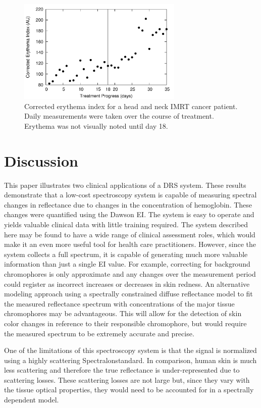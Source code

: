 \begin{figure}
	\centering \includegraphics[width=0.7\textwidth]{figures/p1-cor_ei.png}
	\caption[Corrected erythema index for IMRT cancer patient]{\label{fig:p1-cor_ei}Corrected erythema index for a head and neck IMRT cancer patient. Daily measurements were taken over the course of treatment. Erythema was not visually noted until day 18.}
\end{figure}

\section{Discussion}
This paper illustrates two clinical applications of a DRS system. These results demonstrate that a low-cost spectroscopy system is capable of measuring spectral changes in reflectance due to changes in the concentration of hemoglobin. These changes were quantified using the Dawson EI. The system is easy to operate and yields valuable clinical data with little training required. The system described here may be found to have a wide range of clinical assessment roles, which would make it an even more useful tool for health care practitioners. However, since the system collects a full spectrum, it is capable of generating much more valuable information than just a single EI value. For example, correcting for background chromophores is only approximate and any changes over the measurement period could register as incorrect increases or decreases in skin redness. An alternative modeling approach using a spectrally constrained diffuse reflectance model to fit the measured reflectance spectrum with concentrations of the major tissue chromophores may be advantageous. This will allow for the detection of skin color changes in reference to their responsible chromophore, but would require the measured spectrum to be extremely accurate and precise.

One of the limitations of this spectroscopy system is that the signal is normalized using a highly scattering Spectralon\textregistered standard. In comparison, human skin is much less scattering and therefore the true reflectance is under-represented due to scattering losses. These scattering losses are not large but, since they vary with the tissue optical properties, they would need to be accounted for in a spectrally dependent model.

